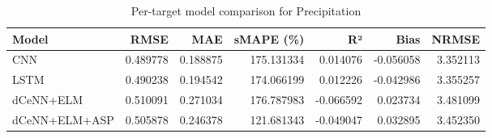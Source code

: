 \begin{table}
\caption{Per-target model comparison for Precipitation}
\begin{tabular}{lrrrrrr}
\toprule
Model & RMSE & MAE & sMAPE (\%) & R² & Bias & NRMSE \\
\midrule
CNN & 0.489778 & 0.188875 & 175.131334 & 0.014076 & -0.056058 & 3.352113 \\
LSTM & 0.490238 & 0.194542 & 174.066199 & 0.012226 & -0.042986 & 3.355257 \\
dCeNN+ELM & 0.510091 & 0.271034 & 176.787983 & -0.066592 & 0.023734 & 3.481099 \\
dCeNN+ELM+ASP & 0.505878 & 0.246378 & 121.681343 & -0.049047 & 0.032895 & 3.452350 \\
\bottomrule
\end{tabular}
\end{table}
